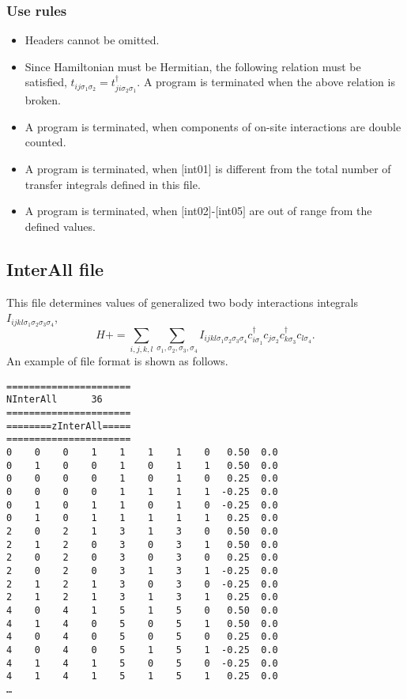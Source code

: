 \subsubsection{Use rules}
\begin{itemize}
\item Headers cannot be omitted. 
\item Since Hamiltonian must be Hermitian, the following relation must be satisfied, $t_{ij\sigma_1\sigma_2}=t_{ji\sigma_2\sigma_1}^{\dagger}$. A program is terminated when the above relation is broken.
\item A program is terminated, when components of on-site interactions are double counted.
\item A program is terminated, when $[$int01$]$ is different from the total number of transfer integrals defined in this file.
\item A program is terminated, when $[$int02$]$-$[$int05$]$ are out of range from the defined values.
\end{itemize}

\newpage
\subsection{InterAll file}
\label{Subsec:interall}
This file determines values of generalized two body interactions integrals $I_{ijkl\sigma_1\sigma_2\sigma_3\sigma_4}$,
\begin{equation}
H+=\sum_{i,j,k,l}\sum_{\sigma_1,\sigma_2, \sigma_3, \sigma_4}
I_{ijkl\sigma_1\sigma_2\sigma_3\sigma_4}c_{i\sigma_1}^{\dagger}c_{j\sigma_2}c_{k\sigma_3}^{\dagger}c_{l\sigma_4}.
\end{equation}
An example of file format is shown as follows.

\begin{minipage}{12.5cm}
\begin{screen}
\begin{verbatim}
====================== 
NInterAll      36  
====================== 
========zInterAll===== 
====================== 
0    0    0    1    1    1    1    0   0.50  0.0
0    1    0    0    1    0    1    1   0.50  0.0
0    0    0    0    1    0    1    0   0.25  0.0
0    0    0    0    1    1    1    1  -0.25  0.0
0    1    0    1    1    0    1    0  -0.25  0.0
0    1    0    1    1    1    1    1   0.25  0.0
2    0    2    1    3    1    3    0   0.50  0.0
2    1    2    0    3    0    3    1   0.50  0.0
2    0    2    0    3    0    3    0   0.25  0.0
2    0    2    0    3    1    3    1  -0.25  0.0
2    1    2    1    3    0    3    0  -0.25  0.0
2    1    2    1    3    1    3    1   0.25  0.0
4    0    4    1    5    1    5    0   0.50  0.0
4    1    4    0    5    0    5    1   0.50  0.0
4    0    4    0    5    0    5    0   0.25  0.0
4    0    4    0    5    1    5    1  -0.25  0.0
4    1    4    1    5    0    5    0  -0.25  0.0
4    1    4    1    5    1    5    1   0.25  0.0
…
\end{verbatim}
\end{screen}
\end{minipage}

